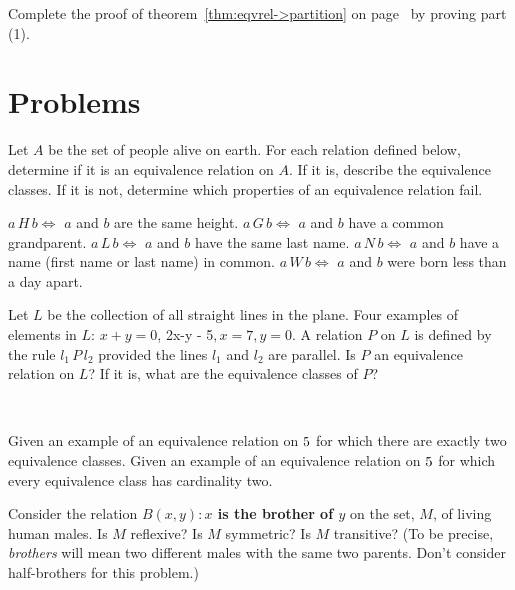 \begin{exer} 
Complete the proof of theorem~\ref{thm:eqvrel->partition} on page~\pageref{thm:eqvrel->partition} by proving part (1).
\end{exer}

\clearpage

\section{Problems}

\begin{prob} 
Let $A$ be the set of people alive on earth. 
For each relation defined below, determine if
it is an equivalence relation on $A$. If it is, describe the equivalence classes.
If it is not, determine which properties of an equivalence relation fail.
\begin{tasks}
  \task $a\,H\,b \iff$  $a$ and $b$ are the same height.
  \task $a\,G\,b \iff$  $a$ and $b$ have a common grandparent.
  \task $a\,L\,b \iff$  $a$ and $b$ have the same last name.
  \task $a\,N\,b \iff$ $a$ and $b$ have a name (first name  or last name) in common.
  \task $a\,W\,b \iff$ $a$ and $b$ were born less than a day apart.
\end{tasks}
\end{prob}

\begin{prob}
Let $L$ be the collection of all straight lines in the plane. Four examples of elements in $L$: $x + y = 0$, 2x-y - 5$, x = 7, y = 0$.
A relation $P$ on $L$ is defined by the rule $l_{1}\, P \, l_{2}$ provided the lines $l_{1}$ and $l_{2}$ are parallel.
Is $P$ an equivalence relation on $L$? If it is, what are the equivalence classes of $P$?
\end{prob}

\begin{prob}
\ %
  \begin{tasks}
     \task Given an example of an equivalence relation on $5$ for which there are exactly
     two equivalence classes.
     \task Given an example of an equivalence relation on $5$ for which every equivalence class
     has cardinality two.
  \end{tasks}
\end{prob}

\begin{prob} 
Consider the relation \textbf{$B(x,y) : x$ is the brother of $y$} on the set, $M$,
of living human males. Is  $M$ reflexive? Is $M$ symmetric? Is $M$ transitive?
(To be precise, {\itshape brothers} will mean two different males with the same two
parents. Don't consider half{-}brothers for this problem.) 
\end{prob}


